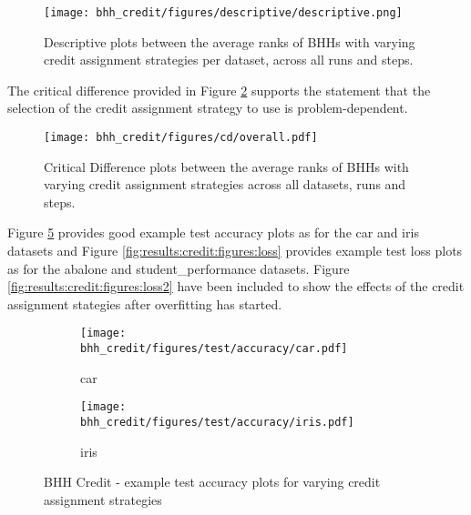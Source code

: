 \begin{figure}[htbp]
      \centering
      \texttt{[image: bhh\_credit/figures/descriptive/descriptive.png]}
      \caption{Descriptive plots between the average ranks of \Acsp{BHH} with varying credit assignment strategies per dataset, across all runs and steps.}
      \label{fig:results:credit:descriptive:descriptive}
\end{figure}

The critical difference provided in Figure \ref{fig:results:credit:descriptive:cd} supports the statement that the selection of the credit assignment strategy to use is problem-dependent.

\begin{figure}[htbp]
      \centering
      \texttt{[image: bhh\_credit/figures/cd/overall.pdf]}
      \caption{Critical Difference plots between the average ranks of \Acsp{BHH} with varying credit assignment strategies across all datasets, runs and steps.}
      \label{fig:results:credit:descriptive:cd}
\end{figure}

Figure \ref{fig:results:credit:figures:accuracy} provides good example test accuracy plots as for the car and iris datasets and Figure \ref{fig:results:credit:figures:loss} provides example test loss plots as for the abalone and student\_performance datasets. Figure \ref{fig:results:credit:figures:loss2} have been included to show the effects of the credit assignment stategies after overfitting has started.


\begin{figure}[htbp]
      \begin{subfigure}{0.5\textwidth}
            \centering
            \texttt{[image: bhh\_credit/figures/test/accuracy/car.pdf]}
            \caption{car}
            \label{fig:results:credit:figures:accuracy1}
      \end{subfigure}
      \begin{subfigure}{0.5\textwidth}
            \centering
            \texttt{[image: bhh\_credit/figures/test/accuracy/iris.pdf]}
            \caption{iris}
            \label{fig:results:credit:figures:accuracy2}
      \end{subfigure}
      \caption{\Acs{BHH} Credit - example test accuracy plots for varying credit assignment strategies}
      \label{fig:results:credit:figures:accuracy}
\end{figure}


